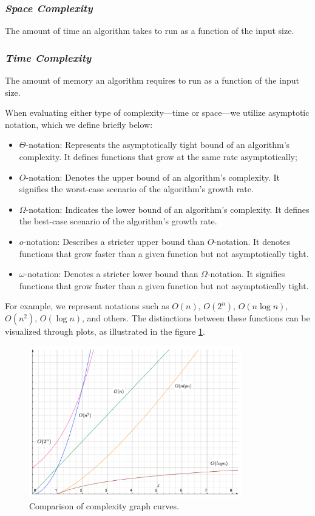 \documentclass[a4paper,10pt]{article}
\begin{document}
\subsubsection{\textit{Space Complexity}}
The amount of \colorbox{color3}{time} an algorithm takes to run as a function of the input size.


\subsubsection{\textit{Time Complexity}}
The amount of \colorbox{color3}{memory} an algorithm requires to run as a function of the input size.

\vspace{0.5cm}
When evaluating either type of complexity—time or space—we utilize asymptotic notation, which we define briefly below:

\begin{itemize}
    \item $\Theta$-notation: Represents the asymptotically tight bound of an algorithm's complexity. It defines functions that grow at the same rate asymptotically;
    \item $O$-notation: Denotes the upper bound of an algorithm's complexity. It signifies the worst-case scenario of the algorithm's growth rate.
    \item $\Omega$-notation: Indicates the lower bound of an algorithm's complexity. It defines the best-case scenario of the algorithm's growth rate.
    \item $o$-notation: Describes a stricter upper bound than $O$-notation. It denotes functions that grow faster than a given function but not asymptotically tight.
    \item $\omega$-notation: Denotes a stricter lower bound than $\Omega$-notation. It signifies functions that grow faster than a given function but not asymptotically tight.
\end{itemize}

For example, we represent notations such as $O(n)$, $O(2^n)$, $O(n \log n)$, $O(n^2)$, $O(\log n)$, and others. The distinctions between these functions can be visualized through plots, as illustrated in the figure \ref{fig:complexity_graph}.

\begin{figure}[ht]
\centering
\includegraphics[height=6.6cm]{figures/complexity_graph.png}
\caption{Comparison of complexity graph curves.}
\label{fig:complexity_graph}
\end{figure}
\end{document}
